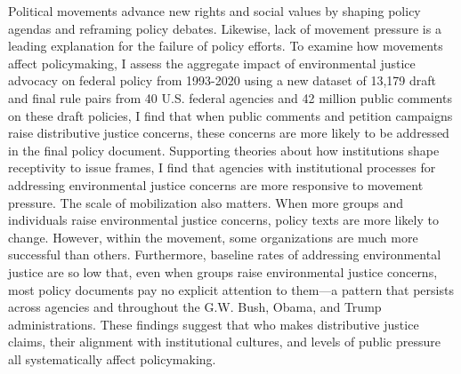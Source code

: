 Political movements advance new rights and social values by shaping policy agendas and reframing policy debates. Likewise, lack of movement pressure is a leading explanation for the failure of policy efforts. To examine how movements affect policymaking, I assess the aggregate impact of environmental justice advocacy on federal policy from 1993-2020 using a new dataset of 13,179 draft and final rule pairs from 40 U.S. federal agencies and 42 million public comments on these draft policies, I find that when public comments and petition campaigns raise distributive justice concerns, these concerns are more likely to be addressed in the final policy document. Supporting theories about how institutions shape receptivity to issue frames, I find that agencies with institutional processes for addressing environmental justice concerns are more responsive to movement pressure. The scale of mobilization also matters. When more groups and individuals raise environmental justice concerns, policy texts are more likely to change. However, within the movement, some organizations are much more successful than others. Furthermore, baseline rates of addressing environmental justice are so low that, even when groups raise environmental justice concerns, most policy documents pay no explicit attention to them---a pattern that persists across agencies and throughout the G.W. Bush, Obama, and Trump administrations. These findings suggest that who makes distributive justice claims, their alignment with institutional cultures, and levels of public pressure all systematically affect policymaking.